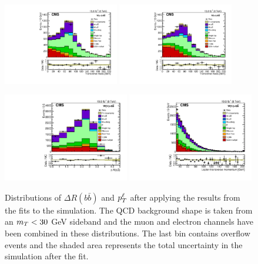 \begin{figure}[htb]
\includegraphics[width=0.45\textwidth]{pdfs/wbbxc/pape/postcfit_wbb_mt_mu} 
\includegraphics[width=0.45\textwidth]{pdfs/wbbxc/pape/postcfit_wbb_mt_ele}
\label{fig:fittingplots}
\end{figure}


\begin{figure}[htb]
\caption[More variables in the \wbb signal region]{
  Distributions of $\Delta R(b\bar{b})$ and $p_T^\ell$ after
   applying the results from the fits to the simulation.
  The QCD background shape is taken from an $m_T<30$ GeV sideband and the
   muon and electron channels have been combined in these distributions.
  The last bin contains overflow events and
   the shaded area represents the total uncertainty in the simulation after the fit.
 }
\center
\includegraphics[width=0.49\textwidth]{pdfs/wbbxc/pape/postcfit_wbb_dRJ1J2}
\includegraphics[width=0.49\textwidth]{pdfs/wbbxc/pape/postcfit_wbb_pTLep}
\label{fig:postfit_drbb_ptl}
\end{figure}

